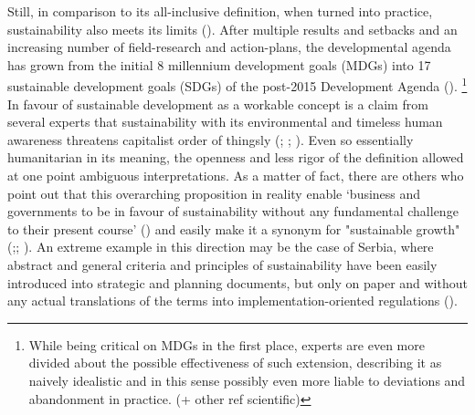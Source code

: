 \documentclass[11pt]{report}
\begin{document}
Still, in comparison to its all-inclusive definition, when turned into practice, sustainability also meets its limits (\href{ref}{\citealt{bolay_what_2012}}).
After multiple results and setbacks and an increasing number of field-research and action-plans, the developmental agenda has grown from the initial 8 millennium development goals (MDGs) into 17 sustainable development goals (SDGs) of the post-2015 Development Agenda (\href{SDG}{\citealt{Post-2015DevelopmentAgenda ??????}}).
\footnote{While being critical on MDGs in the first place, experts are even more divided about the possible effectiveness of such extension, describing it as naively idealistic and in this sense possibly even more liable to deviations and abandonment in practice.
(\href{FinancialTimes}{\citealt{FT}}+ other ref scientific)}
\\

In favour of sustainable development as a workable concept is a claim from several experts that sustainability with its environmental and timeless human awareness threatens capitalist order of thingsly 
(\href{Middleton}{\citealt{MiddletonEtAl1993????}}; \href{Christie}{\citealt{ChristieAndWarburton2001????}}; \href{Hopwood}{\citealt{HopwoodEtAl2005????}}).
Even so essentially humanitarian in its meaning, the openness and less rigor of the definition allowed at one point ambiguous interpretations.
As a matter of fact, there are others who point out that this overarching proposition in reality enable ‘business and governments to be in favour of sustainability without any fundamental challenge to their present course’ (\href{Hopwood}{\citealt{HopwoodEtAl2005????}}) and easily make it a synonym for "sustainable growth" (\href{Daly}{\citealt{Daly1993????}};\href{Rees}{\citealt{Rees1998????}}; \href{Dollar}{\citealt{DollarAndKraay2000????}}).
An extreme example in this direction may be the case of Serbia, where abstract and general criteria and principles of sustainability have been easily introduced into strategic and planning documents, but only on paper and without any actual translations of the terms into implementation-oriented regulations (\href{Vujosevic}{\citealt{vujosevic_novi_2012}}). 
\\
\end{document}
